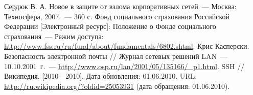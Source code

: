 \documentclass[russian, utf8, pointsubsection, floatsubsection,
equationsection, emptystyle, simple]{eskdtext}
\begin{document}


\tableofcontents
\newpage






\begin{thebibliography}{99}
 Сердюк В. А. Новое в защите от взлома корпоративных
  сетей~--- Москва: Техносфера, 2007.~--- 360 с.
Фонд социального страхования Российской Федерации
  [Электронный ресурс]: Положение о Фонде социального страхования~---
  Режим доступа:
  \url{http://www.fss.ru/ru/fund/about/fundamentals/6802.shtml}. 
 Крис Касперски. Безопасность электронной почты // Журнал
  сетевых решений LAN~--- 10.10.2001~г.~---
  \url{http://www.osp.ru/lan/2001/05/135166/_p1.html}.
 SSH // Википедия. [2010—2010]. Дата обновления:
  01.06.2010. URL: \url{http://ru.wikipedia.org/?oldid=25053931} (дата
  обращения: 01.06.2010).
\end{thebibliography}



\end{document}
